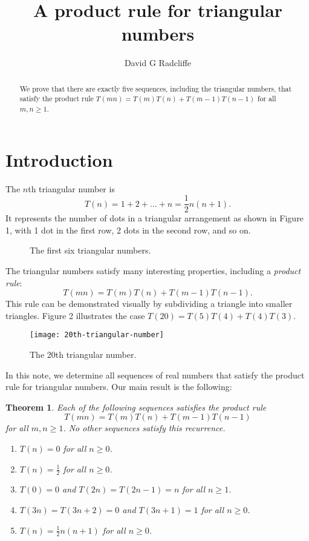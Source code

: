 \documentclass[11pt,fleqn]{amsart}
\newtheorem{theorem}{Theorem}
\begin{document}
\title{A product rule for triangular numbers}
\author{David G Radcliffe}
\begin{abstract}
We prove that there are exactly five sequences, including the triangular numbers,
that satisfy the product rule $T(mn) = T(m) T(n) + T(m-1) T(n-1)$ for all $m, n \ge 1$.
\end{abstract}
\maketitle

\section{Introduction}

The $n$th triangular number is 
$$T(n) = 1 + 2 + \ldots + n = \frac12 n(n+1).$$
It represents the number of dots in a triangular arrangement as shown in Figure 1, 
with 1 dot in the first row, 2 dots in the second row, and so on.

\begin{figure}

\caption{The first six triangular numbers.}
\end{figure}

The triangular numbers satisfy many interesting properties, including a \emph{product rule}:
$$T(mn) = T(m) T(n) + T(m-1) T(n-1).$$
This rule can be demonstrated visually by subdividing a triangle into smaller triangles. Figure 2 illustrates the case 
$T(20) = T(5) T(4) + T(4) T(3)$.

\begin{figure}
\texttt{[image: 20th-triangular-number]}
\caption{The 20th triangular number.}
\end{figure}

In this note, we determine all sequences of real numbers that satisfy the product rule for triangular numbers.
Our main result is the following:

\begin{theorem} Each of the following sequences satisfies the product rule 
$$T(mn) = T(m) T(n) + T(m-1) T(n-1)$$ 
for all $m, n \ge 1$. No other sequences satisfy this recurrence. 

\begin{enumerate}
\item $T(n) = 0$ for all $n \ge 0$.
\item $T(n) = \frac12$ for all $n \ge 0$.
\item $T(0) = 0$ and $T(2n) = T(2n-1) = n$ for all $n \ge 1$.
\item $T(3n) = T(3n+2) = 0$ and $T(3n+1) = 1$ for all $n \ge 0$.
\item $T(n) = \frac12 n(n+1)$ for all $n \ge 0$.
\end{enumerate} 
\end{theorem}
\end{document}
